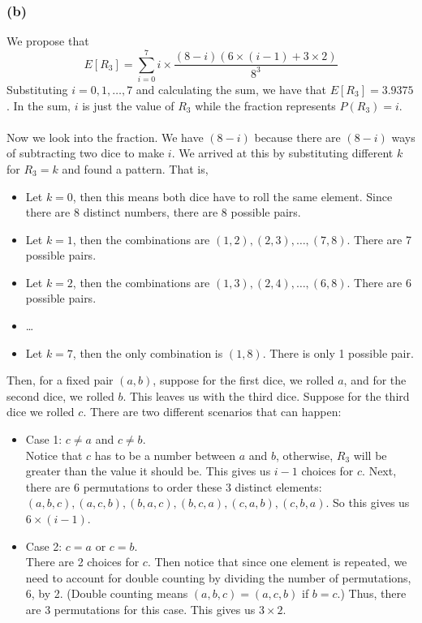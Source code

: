 \documentclass{article}
\begin{document}
\subsubsection*{(b)} 

We propose that $$E[R_3]=\sum_{i=0}^7 i\times \frac{(8-i)(6\times (i-1)+3\times 2)}{8^3}$$ Substituting $i=0,1,\dots, 7$ and calculating the sum, we have that $E[R_3] = 3.9375$. 
In the sum, $i$ is just the value of $R_3$ while the fraction represents $P(R_3)=i$. \\~\\
Now we look into the fraction. We have $(8-i)$ because there are $(8-i)$ ways of subtracting two dice to make $i$. We arrived at this by substituting different $k$ for $R_3=k$ and found a pattern. That is, 
\begin{itemize}
    \item Let $k=0$, then this means both dice have to roll the same element. Since there are 8 distinct numbers, there are 8 possible pairs.
    \item Let $k=1$, then the combinations are $(1,2), (2,3), \dots, (7,8)$. There are 7 possible pairs. 
    \item Let $k=2$, then the combinations are $(1,3), (2,4), \dots, (6,8)$. There are 6 possible pairs. 
    \item \dots
    \item Let $k=7$, then the only combination is $(1, 8)$. There is only 1 possible pair.
\end{itemize}
Then, for a fixed pair $(a, b)$, suppose for the first dice, we rolled $a$, and for the second dice, we rolled $b$. This leaves us with the third dice. Suppose for the third dice we rolled $c$. There are two different scenarios that can happen:
\begin{itemize}
    \item Case 1: $c\neq a$ and $c\neq b$. \\ 
    Notice that $c$ has to be a number between $a$ and $b$, otherwise, $R_3$ will be greater than the value it should be. This gives us $i-1$ choices for $c$. Next, there are 6 permutations to order these 3 distinct elements: $(a, b, c), (a, c, b), (b, a, c), (b, c, a), (c, a, b), (c, b, a)$. So this gives us $6\times (i-1)$. 
    \item Case 2: $c=a$ or $c=b$.\\
    There are 2 choices for $c$. Then notice that since one element is repeated, we need to account for double counting by dividing the number of permutations, 6, by 2. (Double counting means $(a, b, c) = (a, c, b)$ if $b=c$.) Thus, there are 3 permutations for this case. This gives us $3\times 2$.
\end{itemize}
\end{document}
